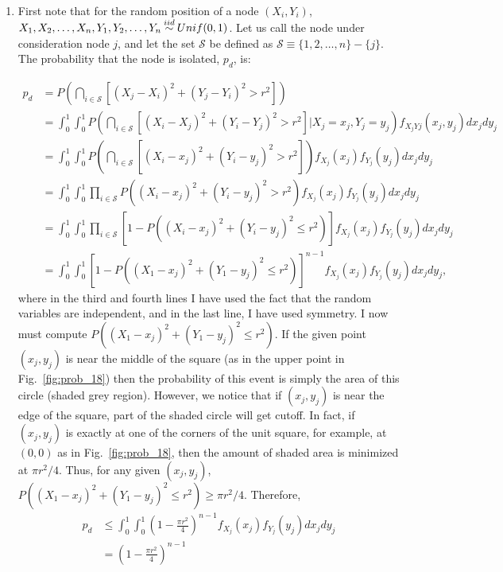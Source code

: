 \begin{problem}{18} $ $
\begin{enumerate}

\item First note that for the random position of a node $(X_i, Y_i)$, $X_1, X_2, \ldots, X_n, Y_1, Y_2, \ldots, Y_n \distas{iid} Unif(0, 1)$.  Let us call the node under consideration node $j$, and let the set $\mathcal S$ be defined as $\mathcal S \equiv \{1, 2, \ldots, n \}-\{j\}$.  The probability that the node is isolated, $p_d$, is:

\begin{align*}
p_d &= P\left(\bigcap_{i \in \mathcal S}\left  [(X_j-X_i)^2+(Y_j-Y_i)^2>r^2 \right] \right) \\
& = \int_0^1 \int_0^1 P\left(\bigcap_{i \in \mathcal S}\left  [(X_i-X_j)^2+(Y_i-Y_j)^2>r^2 \right]  \Big |X_j=x_j, Y_j=y_j\right)f_{X_jYj}(x_j,y_j) dx_j dy_j \\
& = \int_0^1 \int_0^1 P\left(\bigcap_{i \in \mathcal S}\left  [(X_i-x_j)^2+(Y_i-y_j)^2>r^2 \right]  \right)f_{X_j}(x_j) f_{Y_j}(y_j) dx_j dy_j \\
& =  \int_0^1 \int_0^1 \prod_{i \in \mathcal S} P\left((X_i-x_j)^2+(Y_i-y_j)^2>r^2  \right)f_{X_j}(x_j) f_{Y_j}(y_j) dx_j dy_j \\
& =  \int_0^1 \int_0^1 \prod_{i \in \mathcal S} \left[1-P\left((X_i-x_j)^2+(Y_i-y_j)^2 \le r^2  \right)\right]f_{X_j}(x_j) f_{Y_j}(y_j) dx_j dy_j \\
& =  \int_0^1 \int_0^1 \left[1-P\left((X_1-x_j)^2+(Y_1-y_j)^2 \le r^2  \right)\right]^{n-1} f_{X_j}(x_j) f_{Y_j}(y_j) dx_j dy_j,
\end{align*}
where in the third and fourth lines I have used the fact that the random variables are independent, and in the last line, I have used symmetry.  I now must compute $P((X_1-x_j)^2+(Y_1-y_j)^2 \le r^2 )$.  If the given point $(x_j, y_j)$ is near the middle of the square (as in the upper point in Fig.~\ref{fig:prob_18}) then the probability of this event is simply the area of this circle (shaded grey region).  However, we notice that if $(x_j, y_j)$ is near the edge of the square, part of the shaded circle will get cutoff.  In fact, if $(x_j, y_j)$ is exactly at one of the corners of the unit square, for example, at $(0,0)$ as in Fig.~\ref{fig:prob_18}, then the amount of shaded area is minimized at $\pi r^2/4$.  Thus, for any given $(x_j, y_j)$, $P((X_1-x_j)^2+(Y_1-y_j)^2 \le r^2 ) \ge \pi r^2/4$.  Therefore,
\begin{align*}
p_d & \le \int_0^1 \int_0^1 \left(1-\frac{\pi r^2}{4}\right)^{n-1} f_{X_j}(x_j) f_{Y_j}(y_j) dx_j dy_j \\
&= \left(1-\frac{\pi r^2}{4}\right)^{n-1}
\end{align*}


\end{enumerate}
\end{problem}
